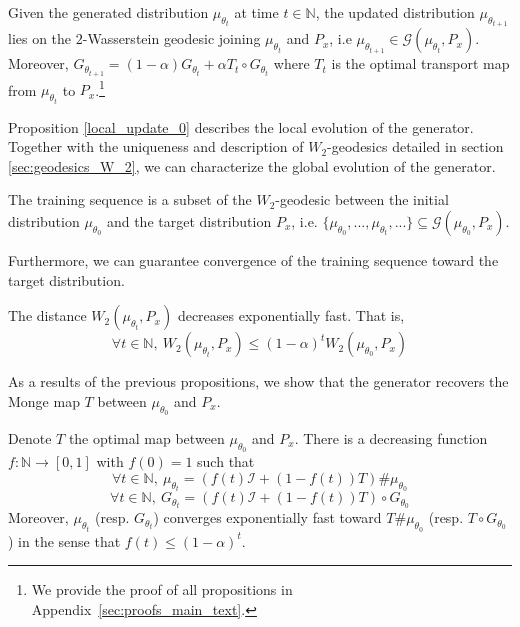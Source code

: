 \documentclass[runningheads]{llncs}
\newcommand{\id}{\mathcal{I}}
\begin{document}
\begin{proposition}
\normalfont
Given the generated distribution $\mu_{\theta_t}$ at time $t\in \mathds{N}$, the updated distribution $\mu_{\theta_{t+1}}$ lies on the $2$-Wasserstein geodesic joining $\mu_{\theta_t}$ and $P_x$, i.e $\mu_{\theta_{t+1}}\in \mathcal{G}(\mu_{\theta_t},P_x)$. Moreover, $G_{\theta_{t+1}}=(1-\alpha)G_{\theta_{t}}+ \alpha T_t \circ G_{\theta_{t}}$ where $T_t$ is the optimal transport map from $\mu_{\theta_t}$ to $P_x$.\footnote{We provide the proof of all propositions in Appendix~\ref{sec:proofs_main_text}.}
\label{local_update_0}
\end{proposition}
Proposition \ref{local_update_0} describes the local evolution of the generator. Together with the uniqueness and description of $W_2$-geodesics detailed in section \ref{sec:geodesics_W_2}, we can characterize the global evolution of the generator.
\begin{proposition}
\normalfont
\label{global_evolution_generated_distrib}
The training sequence is a subset of the $W_2$-geodesic between the initial distribution $\mu_{\theta_0}$ and the target distribution $P_x$, i.e. $\{\mu_{\theta_0},...,\mu_{\theta_t},...\} \subseteq \mathcal{G}(\mu_{\theta_0},P_x)$.
\end{proposition}
Furthermore, we can guarantee convergence of the training sequence toward the target distribution.
\begin{proposition}
\normalfont
\label{decreasing_ditance}
The distance $W_2(\mu_{\theta_t},P_x)$ decreases exponentially fast. That is,
\[\forall t \in \mathds{N}, \ W_2(\mu_{\theta_t},P_x)\leqslant (1-\alpha)^{t}W_2(\mu_{\theta_0},P_x)\]
\end{proposition}
As a results of the previous propositions, we show that the generator recovers the Monge map $T$ between $\mu_{\theta_0}$ and $P_x$.
\begin{proposition}
\normalfont
Denote $T$ the optimal map between $\mu_{\theta_0}$ and $P_x$. There is a decreasing function $f:\mathds{N}\rightarrow [0,1]$ with $f(0)=1$ such that
\label{generator_recovers_T}
\[\forall t \in \mathds{N}, \ \mu_{\theta_t}=(f(t)\id+ (1-f(t))T)\# \mu_{\theta_0} \]
\[\forall t \in \mathds{N}, \ G_{\theta_t}=(f(t)\id+ (1-f(t))T)\circ G_{\theta_0} \]
Moreover, $\mu_{\theta_t}$ (resp. $G_{\theta_t}$) converges exponentially fast toward $T \# \mu_{\theta_0}$ (resp. $T\circ G_{\theta_0}$) in the sense that $f(t)\leqslant (1-\alpha)^t$.
\end{proposition}
\end{document}
